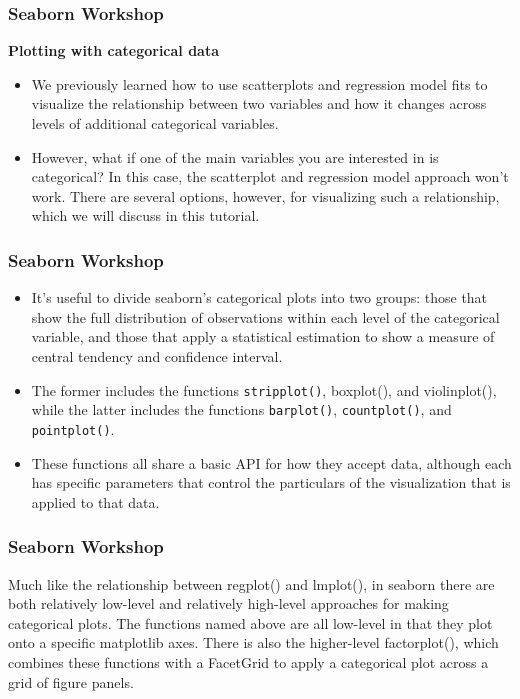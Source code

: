 \documentclass{beamer}
\begin{document}
\begin{frame}[fragile]
\frametitle{Seaborn Workshop}
\large
\noindent \textbf{Plotting with categorical data}
\begin{itemize}
\item We previously learned how to use scatterplots and regression model fits to visualize the relationship between two variables and how it changes across levels of additional categorical variables. 
\item However, what if one of the main variables you are interested in is categorical? In this case, the scatterplot and regression model approach won’t work. There are several options, however, for visualizing such a relationship, which we will discuss in this tutorial.
\end{itemize}

\end{frame}
\begin{frame}[fragile]
\frametitle{Seaborn Workshop}
\large
\begin{itemize}
\item It’s useful to divide seaborn’s categorical plots into two groups: those that show the full distribution of observations within each level of the categorical variable, and those that apply a statistical estimation to show a measure of central tendency and confidence interval. \item The former includes the functions \texttt{stripplot()}, boxplot(), and violinplot(), while the latter includes the functions \texttt{barplot()}, \texttt{countplot()}, and \texttt{pointplot()}. \item These functions all share a basic API for how they accept data, although each has specific parameters that control the particulars of the visualization that is applied to that data.
\end{itemize}

\end{frame}
\begin{frame}[fragile]
\frametitle{Seaborn Workshop}
\large

Much like the relationship between regplot() and lmplot(), in seaborn there are both relatively low-level and relatively high-level approaches for making categorical plots. The functions named above are all low-level in that they plot onto a specific matplotlib axes. There is also the higher-level factorplot(), which combines these functions with a FacetGrid to apply a categorical plot across a grid of figure panels.
\end{frame}
\end{document}

